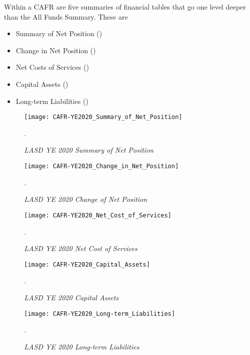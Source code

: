 Within a CAFR are five summaries of financial tables that go one level deeper than the All Funds Summary. These are
\begin{itemize}\OnehalfSpacing%
    \item Summary of Net Position ()
    \item Change in Net Position  ()
    \item Net Costs of Services   ()
    \item Capital Assets          ()
    \item Long-term Liabilities   ()
  \end{itemize}

\begin{figure}
  \centering
  \caption[LASD YE 2020 Summary of Net Position]{\textit{LASD YE 2020 Summary of Net Position}}\label{fig:net-position}
  \texttt{[image: CAFR-YE2020\_Summary\_of\_Net\_Position]}\\
  \footnotesize\raggedright\textcite[6]{Kenyon2021}.
\end{figure}

\begin{figure}
  \centering
  \caption[LASD YE 2020 Change of Net Position]{\textit{LASD YE 2020 Change of Net Position}}\label{fig:Change_Position}
  \texttt{[image: CAFR-YE2020\_Change\_in\_Net\_Position]}\\
  \footnotesize\raggedright\textcite[7]{Kenyon2021}.
\end{figure}

\begin{figure}
  \centering
  \caption[LASD YE 2020 Net Cost of Services]{\textit{LASD YE 2020 Net Cost of Services}}\label{fig:Cost_Services}
  \texttt{[image: CAFR-YE2020\_Net\_Cost\_of\_Services]}\\
  \footnotesize\raggedright\textcite[9]{Kenyon2021}.
\end{figure}

\begin{figure}
  \centering
  \caption[LASD YE 2020 Capital Assets]{\textit{LASD YE 2020 Capital Assets}}\label{fig:Capital_Assets}
  \texttt{[image: CAFR-YE2020\_Capital\_Assets]}\\
  \footnotesize\raggedright\textcite[10]{Kenyon2021}.
\end{figure}

\begin{figure}
  \centering
  \caption[LASD YE 2020 Long-term Liabilities]{\textit{LASD YE 2020 Long-term Liabilities}}\label{fig:Long-term_Liabilities}
  \texttt{[image: CAFR-YE2020\_Long-term\_Liabilities]}\\
  \footnotesize\raggedright\textcite[11]{Kenyon2021}.
\end{figure}%

